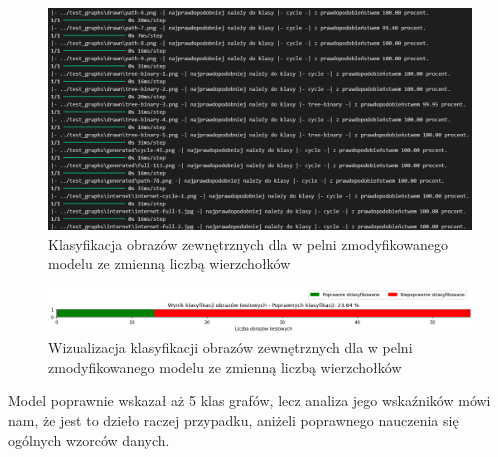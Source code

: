 \begin{figure}[ht]
	\centering
	\includegraphics[width=14cm]{resources/tests/images/v4/multiple_edges_txt.png}
	\caption{Klasyfikacja obrazów zewnętrznych dla w pelni zmodyfikowanego modelu ze zmienną liczbą wierzchołków}
	\label{Fig:tests-var-2b}
\end{figure}
\FloatBarrier

\begin{figure}[ht]
	\centering
	\includegraphics[width=14cm]{resources/tests/images/v4/multiple_edges_bar.png}
	\caption{Wizualizacja klasyfikacji obrazów zewnętrznych dla w pelni zmodyfikowanego modelu ze zmienną liczbą wierzchołków}
	\label{Fig:tests-var-2c}
\end{figure}
\FloatBarrier

Model poprawnie wskazał aż 5 klas grafów, lecz analiza jego wskaźników mówi nam,
że jest to dzieło raczej przypadku, aniżeli poprawnego nauczenia się ogólnych wzorców danych.